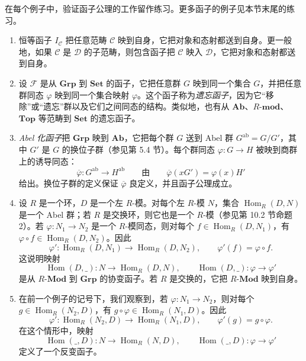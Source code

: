 在每个例子中，验证函子公理的工作留作练习。更多函子的例子见本节末尾的练习。
\begin{enumerate}[label=(\arabic*)]
  \item 恒等函子 $I_{\mathcal C}$ 把任意范畴 $\mathcal C$ 映到自身，它把对象和态射都送到自身。更一般地，如果 $\mathcal C$ 是 $\mathcal D$ 的子范畴，则包含函子把 $\mathcal C$ 映入 $\mathcal D$，它把对象和态射都送到自身。

  \item 设 $\mathcal F$ 是从 $\mathbf{Grp}$ 到 $\mathbf{Set}$ 的函子，它把任意群 $G$ 映到同一个集合 $G$，并把任意群同态 $\varphi$ 映到同一个集合映射 $\varphi$。这个函子称为\emph{遗忘函子}，因为它“移除”或“遗忘”群以及它们之间同态的结构。类似地，也有从 $\mathbf{Ab}$、$R\text{-}\mathbf{mod}$、$\mathbf{Top}$ 等范畴到 $\mathbf{Set}$ 的遗忘函子。

  \item \emph{Abel 化函子}把 $\mathbf{Grp}$ 映到 $\mathbf{Ab}$，它把每个群 $G$ 送到 Abel 群 $G^{\mathrm{ab}}=G/G'$，其中 $G'$ 是 $G$ 的换位子群（参见第 5.4 节）。每个群同态 $\varphi:G\to H$ 被映到商群上的诱导同态：
  \[
    \overline\varphi:G^{\mathrm{ab}}\longrightarrow H^{\mathrm{ab}}
    \qquad\text{由}\qquad
    \overline\varphi(xG')=\varphi(x)H'
  \]
  给出。换位子群的定义保证 $\overline\varphi$ 良定义，并且函子公理成立。

  \item 设 $R$ 是一个环，$D$ 是一个左 $R$-模。对每个左 $R$-模 $N$，集合 $\operatorname{Hom}_R(D,N)$ 是一个 Abel 群；若 $R$ 是交换环，则它也是一个 $R$-模（参见第 10.2 节命题 2）。若 $\varphi:N_1\to N_2$ 是一个 $R$-模同态，则对每个 $f\in\operatorname{Hom}_R(D,N_1)$，有 $\varphi\circ f\in\operatorname{Hom}_R(D,N_2)$。因此
  \[
    \varphi':\operatorname{Hom}_R(D,N_1)\longrightarrow\operatorname{Hom}_R(D,N_2),
    \qquad \varphi'(f)=\varphi\circ f.
  \]
  这说明映射
  \[
    \operatorname{Hom}(D,\_):N\longrightarrow\operatorname{Hom}_R(D,N),
    \qquad
    \operatorname{Hom}(D,\_):\varphi\longrightarrow\varphi'
  \]
  是从 $R\text{-}\mathbf{Mod}$ 到 $\mathbf{Grp}$ 的协变函子。若 $R$ 是交换的，它把 $R\text{-}\mathbf{Mod}$ 映到自身。

  \item 在前一个例子的记号下，我们观察到，若 $\varphi:N_1\to N_2$，则对每个 $g\in\operatorname{Hom}_R(N_2,D)$，有 $g\circ\varphi\in\operatorname{Hom}_R(N_1,D)$。因此
  \[
    \varphi':\operatorname{Hom}_R(N_2,D)\longrightarrow\operatorname{Hom}_R(N_1,D),
    \qquad \varphi'(g)=g\circ\varphi.
  \]
  在这个情形中，映射
  \[
    \operatorname{Hom}(\_,D):N\longrightarrow\operatorname{Hom}_R(N,D),
    \qquad
    \operatorname{Hom}(\_,D):\varphi\longrightarrow\varphi'
  \]
  定义了一个反变函子。


\end{enumerate}
